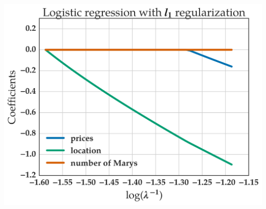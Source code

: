 \documentclass[11pt]{beamer}
\begin{document}
\begin{frame}
\begin{columns}
\begin{column}{0.5\linewidth}
\begin{center}
      \end{center}
      \begin{center}
        \includegraphics[scale=0.2]{figures/logistic_regression_l1_coef_path.png}
      \end{center}
    \end{column}
  \end{columns}
\end{frame}
\end{document}
